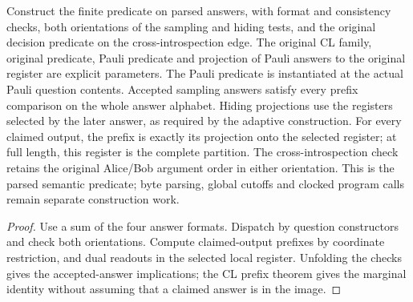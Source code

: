\begin{lemma}
\label{lem:intro-parsed-predicate}
\leanok
Construct the finite predicate on parsed answers, with format and consistency
checks, both orientations of the sampling and hiding tests, and the original
decision predicate on the cross-introspection edge. The original CL family,
original predicate, Pauli predicate and projection of Pauli answers to the
original register are explicit parameters. The Pauli predicate is instantiated
at the actual Pauli question contents. Accepted sampling answers satisfy every
prefix comparison on the whole answer alphabet. Hiding projections use the
registers selected by the later answer, as required by the adaptive construction.
For every claimed output, the prefix is exactly its projection onto the
selected register; at full length, this register is the complete partition.
The cross-introspection check retains the original Alice/Bob argument order
in either orientation. This is the parsed semantic predicate; byte parsing,
global cutoffs and clocked program calls remain separate construction work.
\end{lemma}
\begin{proof}
\leanok
Use a sum of the four answer formats. Dispatch by question constructors and
check both orientations. Compute claimed-output prefixes by coordinate
restriction, and dual readouts in the selected local register. Unfolding the
checks gives the accepted-answer implications; the CL prefix theorem gives
the marginal identity without assuming that a claimed answer is in the image.
\end{proof}

